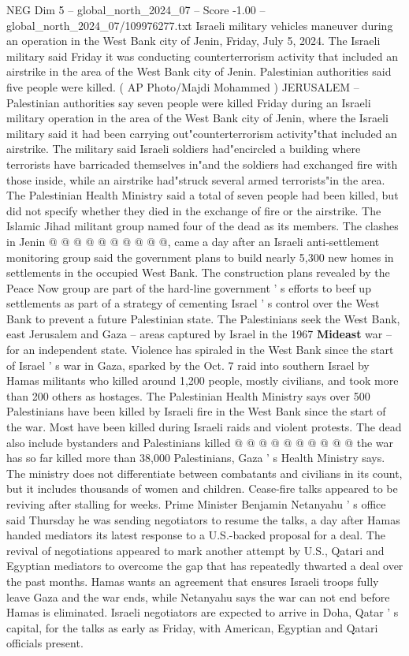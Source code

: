 \begin{textsample}{NEG Dim 5 – global\_north\_2024\_07 – Score -1.00 – global\_north\_2024\_07/109976277.txt}  \label{ex:f5_neg_157}
Israeli military vehicles maneuver during an operation in the West Bank city of Jenin, Friday, July 5, 2024.
The Israeli military said Friday it was conducting counterterrorism activity that included an airstrike in the area of the West Bank city of Jenin.
Palestinian authorities said five people were killed. ( AP Photo/Majdi Mohammed ) JERUSALEM -- Palestinian authorities say seven people were killed Friday during an Israeli military operation in the area of the West Bank city of Jenin, where the Israeli military said it had been carrying out"counterterrorism activity"that included an airstrike.
The military said Israeli soldiers had"encircled a building where terrorists have barricaded themselves in"and the soldiers had exchanged fire with those inside, while an airstrike had"struck several armed terrorists"in the area.
The Palestinian Health Ministry said a total of seven people had been killed, but did not specify whether they died in the exchange of fire or the airstrike.
The Islamic Jihad militant group named four of the dead as its members.
The clashes in Jenin @ @ @ @ @ @ @ @ @ @, came a day after an Israeli anti-settlement monitoring group said the government plans to build nearly 5,300 new homes in settlements in the occupied West Bank.
The construction plans revealed by the Peace Now group are part of the hard-line government ' s efforts to beef up settlements as part of a strategy of cementing Israel ' s control over the West Bank to prevent a future Palestinian state.
The Palestinians seek the West Bank, east Jerusalem and Gaza -- areas captured by Israel in the 1967 \textbf{Mideast} war -- for an independent state.
Violence has spiraled in the West Bank since the start of Israel ' s war in Gaza, sparked by the Oct. 7 raid into southern Israel by Hamas militants who killed around 1,200 people, mostly civilians, and took more than 200 others as hostages.
The Palestinian Health Ministry says over 500 Palestinians have been killed by Israeli fire in the West Bank since the start of the war.
Most have been killed during Israeli raids and violent protests.
The dead also include bystanders and Palestinians killed @ @ @ @ @ @ @ @ @ @ the war has so far killed more than 38,000 Palestinians, Gaza ' s Health Ministry says.
The ministry does not differentiate between combatants and civilians in its count, but it includes thousands of women and children.
Cease-fire talks appeared to be reviving after stalling for weeks.
Prime Minister Benjamin Netanyahu ' s office said Thursday he was sending negotiators to resume the talks, a day after Hamas handed mediators its latest response to a U.S.-backed proposal for a deal.
The revival of negotiations appeared to mark another attempt by U.S., Qatari and Egyptian mediators to overcome the gap that has repeatedly thwarted a deal over the past months.
Hamas wants an agreement that ensures Israeli troops fully leave Gaza and the war ends, while Netanyahu says the war can not end before Hamas is eliminated.
Israeli negotiators are expected to arrive in Doha, Qatar ' s capital, for the talks as early as Friday, with American, Egyptian and Qatari officials present.

\end{textsample}
